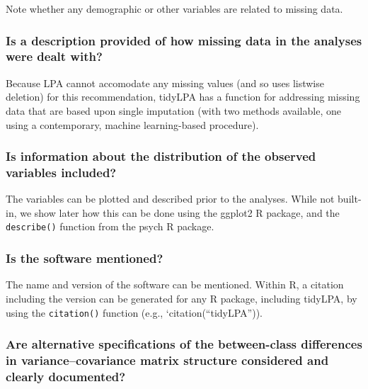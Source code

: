 \documentclass[man]{apa6}
\begin{document}
Note whether any demographic or other variables are related to missing data.

\hypertarget{is-a-description-provided-of-how-missing-data-in-the-analyses-were-dealt-with}{%
\subsubsection{Is a description provided of how missing data in the analyses were dealt with?}\label{is-a-description-provided-of-how-missing-data-in-the-analyses-were-dealt-with}}

Because LPA cannot accomodate any missing values (and so uses listwise deletion) for this recommendation, tidyLPA has a function for addressing missing data that are based upon single imputation (with two methods available, one using a contemporary, machine learning-based procedure).

\hypertarget{is-information-about-the-distribution-of-the-observed-variables-included}{%
\subsubsection{Is information about the distribution of the observed variables included?}\label{is-information-about-the-distribution-of-the-observed-variables-included}}

The variables can be plotted and described prior to the analyses. While not built-in, we show later how this can be done using the ggplot2 R package, and the \texttt{describe()} function from the psych R package.

\hypertarget{is-the-software-mentioned}{%
\subsubsection{Is the software mentioned?}\label{is-the-software-mentioned}}

The name and version of the software can be mentioned. Within R, a citation including the version can be generated for any R package, including tidyLPA, by using the \texttt{citation()} function (e.g., `citation(\enquote{tidyLPA})).

\hypertarget{are-alternative-specifications-of-the-between-class-differences-in-variancecovariance-matrix-structure-considered-and-clearly-documented}{%
\subsubsection{Are alternative specifications of the between-class differences in variance--covariance matrix structure considered and clearly documented?}\label{are-alternative-specifications-of-the-between-class-differences-in-variancecovariance-matrix-structure-considered-and-clearly-documented}}
\end{document}
